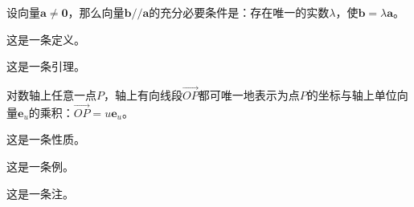 \begin{theorem}
  设向量$\boldsymbol a\neq\boldsymbol 0$，那么向量$\boldsymbol b//\boldsymbol a$的充分必要条件是：存在唯一的实数$\lambda$，使$\boldsymbol b=\lambda \boldsymbol a$。
\end{theorem}
\begin{definition}
  这是一条定义。
\end{definition}
\begin{lemma}
  这是一条引理。
\end{lemma}
\begin{corollary}
  对数轴上任意一点$P$，轴上有向线段$\vec {OP}$都可唯一地表示为点$P$的坐标与轴上单位向量$\boldsymbol e_u$的乘积：$\vec {OP}=u \boldsymbol e_u$。
\end{corollary}
\begin{proposition}
  这是一条性质。
\end{proposition}
\begin{example}
  这是一条例。
\end{example}
\begin{remark}
  这是一条注。
\end{remark}
